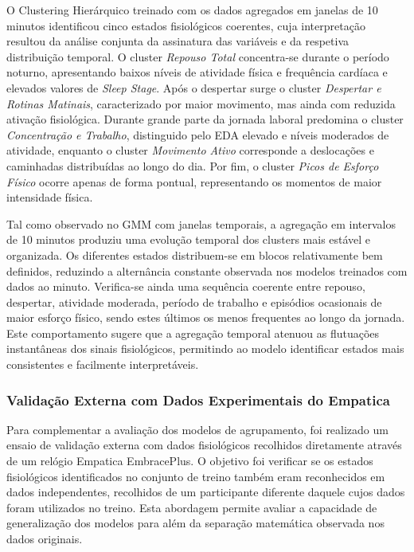\begin{enumerate}
O Clustering Hierárquico treinado com os dados agregados em janelas de 10 minutos identificou cinco estados fisiológicos coerentes, cuja interpretação resultou da análise conjunta da assinatura das variáveis e da respetiva distribuição temporal. O cluster \textit{Repouso Total} concentra-se durante o período noturno, apresentando baixos níveis de atividade física e frequência cardíaca e elevados valores de \textit{Sleep Stage}. Após o despertar surge o cluster \textit{Despertar e Rotinas Matinais}, caracterizado por maior movimento, mas ainda com reduzida ativação fisiológica. Durante grande parte da jornada laboral predomina o cluster \textit{Concentração e Trabalho}, distinguido pelo EDA elevado e níveis moderados de atividade, enquanto o cluster \textit{Movimento Ativo} corresponde a deslocações e caminhadas distribuídas ao longo do dia. Por fim, o cluster \textit{Picos de Esforço Físico} ocorre apenas de forma pontual, representando os momentos de maior intensidade física.

Tal como observado no GMM com janelas temporais, a agregação em intervalos de 10 minutos produziu uma evolução temporal dos clusters mais estável e organizada. Os diferentes estados distribuem-se em blocos relativamente bem definidos, reduzindo a alternância constante observada nos modelos treinados com dados ao minuto. Verifica-se ainda uma sequência coerente entre repouso, despertar, atividade moderada, período de trabalho e episódios ocasionais de maior esforço físico, sendo estes últimos os menos frequentes ao longo da jornada. Este comportamento sugere que a agregação temporal atenuou as flutuações instantâneas dos sinais fisiológicos, permitindo ao modelo identificar estados mais consistentes e facilmente interpretáveis.
\end{enumerate}

\subsubsection*{Validação Externa com Dados Experimentais do Empatica}
\label{sec:validacao_externa}

Para complementar a avaliação dos modelos de agrupamento, foi realizado um ensaio de validação externa com dados fisiológicos recolhidos diretamente através de um relógio Empatica EmbracePlus. O objetivo foi verificar se os estados fisiológicos identificados no conjunto de treino também eram reconhecidos em dados independentes, recolhidos de um participante diferente daquele cujos dados foram utilizados no treino. Esta abordagem permite avaliar a capacidade de generalização dos modelos para além da separação matemática observada nos dados originais.

